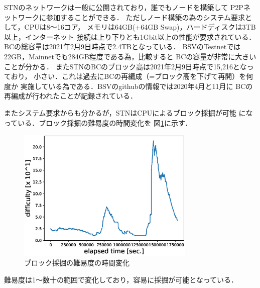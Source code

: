 \documentclass[graybox]{svmult}
\begin{document}
STNのネットワークは一般に公開されており，誰でもノードを構築して
P2Pネットワークに参加することができる．
ただしノード構築の為のシステム要求として，CPUは8〜16コア，
メモリは64GB(+64GB Swap)，ハードディスクは3TB以上，インターネット
接続は上り下りとも1Gbit以上の性能が要求されている．
BCの総容量は2021年2月9日時点で2.4TBとなっている．
BSVのTestnetでは22GB，Mainnetでも284GB程度である為，比較すると
BCの容量が非常に大きいことが分かる．
またSTNのBCのブロック高は2021年2月9日時点で15,216となっており，
小さい．これは過去にBCの再編成（=ブロック高を下げて再開）を何度か
実施している為である．BSVのgithubの情報では2020年4月と11月に
BCの再編成が行われたことが記録されている．

またシステム要求からも分かるが，STNはCPUによるブロック採掘が可能
になっている．ブロック採掘の難易度の時間変化を
図\ref{fig:difficulty}に示す．
%
\begin{figure}[tb]
  \vspace{-20mm}
  \begin{center}
    \includegraphics[width=85mm]{time_vs_difficulty-plot.eps}
  \end{center}
  \vspace{20mm}
  \caption{ブロック採掘の難易度の時間変化}
  \label{fig:difficulty}
\end{figure}
%
難易度は1〜数十の範囲で変化しており，容易に採掘が可能となっている．
\end{document}
